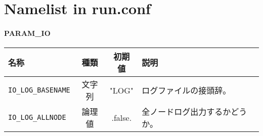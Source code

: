 \chapter{Namelist in run.conf}

\subsubsection{PARAM\_IO}
\begin{tabularx}{150mm}{|l|c|c|X|} \hline
 \rowcolor[gray]{0.9} 名称 & 種類 & 初期値 & 説明 \\ \hline
 \verb|IO_LOG_BASENAME| & 文字列 & "LOG" & ログファイルの接頭辞。 \\ \hline
 \verb|IO_LOG_ALLNODE| & 論理値 & .false. & 全ノードログ出力するかどうか。 \\ \hline
\end{tabularx}



